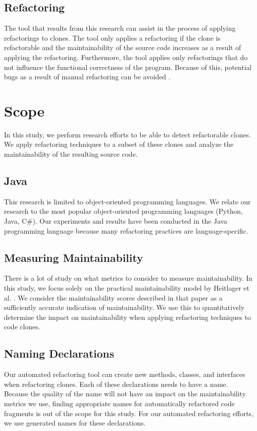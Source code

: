 \subsection{Refactoring}
The tool that results from this research can assist in the process of applying refactorings to clones. The tool only applies a refactoring if the clone is refactorable and the maintainability of the source code increases as a result of applying the refactoring. Furthermore, the tool applies only refactorings that do not influence the functional correctness of the program. Because of this, potential bugs as a result of manual refactoring can be avoided \cite{bavota2012does}.

\section{Scope}
In this study, we perform research efforts to be able to detect refactorable clones. We apply refactoring techniques to a subset of these clones and analyze the maintainability of the resulting source code.

\subsection{Java}
This research is limited to object-oriented programming languages. We relate our research to the most popular object-oriented programming languages (Python, Java, C\#). Our experiments and results have been conducted in the Java programming language because many refactoring practices are language-specific.

\subsection{Measuring Maintainability}
There is a lot of study on what metrics to consider to measure maintainability. In this study, we focus solely on the practical maintainability model by Heitlager et al. \cite{heitlager2007practical}. We consider the maintainability scores described in that paper as a sufficiently accurate indication of maintainability. We use this to quantitatively determine the impact on maintainability when applying refactoring techniques to code clones.

\subsection{Naming Declarations}
Our automated refactoring tool can create new methods, classes, and interfaces when refactoring clones. Each of these declarations needs to have a name. Because the quality of the name will not have an impact on the maintainability metrics we use, finding appropriate names for automatically refactored code fragments is out of the scope for this study. For our automated refactoring efforts, we use generated names for these declarations.

